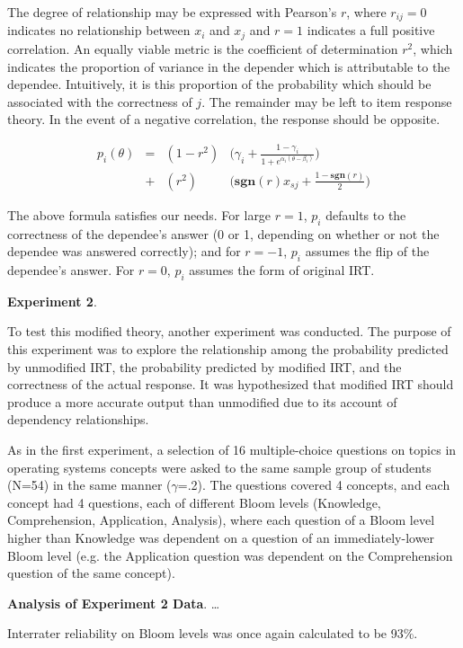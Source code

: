 \documentclass[a4paper,twocolumn]{article}
\begin{document}
The degree of relationship may be expressed with Pearson's $r$, where
$r_{ij}=0$ indicates no relationship between $x_i$ and $x_j$ and $r=1$
indicates a full positive correlation.  An equally viable metric is the
coefficient of determination $r^2$, which indicates the proportion of variance
in the depender which is attributable to the dependee.  Intuitively, it is
this proportion of the probability which should be associated with the
correctness of $j$.  The remainder may be left to item response theory.
In the event of a negative correlation, the response should be opposite.


\begin{align*}
  p_i(\theta) &=& (1-r^2) & \Big(\gamma_i + \frac{1-\gamma_i}{1+e^{\alpha_i(\theta-\beta_i)}}\Big) \\
              &+& (r^2)   & \Big(\mathbf{sgn}(r)x_{sj}+\frac{1-\mathbf{sgn}(r)}{2}\Big)
\end{align*}

The above formula satisfies our needs.  For large $r=1$, $p_i$ defaults to the
correctness of the dependee's answer (0 or 1, depending on whether or not the
dependee was answered correctly);  and for $r=-1$, $p_i$ assumes the flip of
the dependee's answer.  For $r=0$, $p_i$ assumes the form of original IRT.  


\textbf{Experiment 2}. 

To test this modified theory, another experiment was conducted.  The purpose of
this experiment was to explore the relationship among the probability predicted
by unmodified IRT, the probability predicted by modified IRT, and the
correctness of the actual response.  It was hypothesized that modified IRT
should produce a more accurate output than unmodified due to its account of
dependency relationships.

As in the first experiment, a selection of 16 multiple-choice questions on
topics in operating systems concepts were asked to the same sample group of
students (N=54) in the same manner ($\gamma$=.2).  The questions covered 4
concepts, and each concept had 4 questions, each of different Bloom levels
(Knowledge, Comprehension, Application, Analysis), where each question of a
Bloom level higher than Knowledge was dependent on a question of an
immediately-lower Bloom level (e.g. the Application question was dependent on
the Comprehension question of the same concept).


\textbf{Analysis of Experiment 2 Data}. \ldots

Interrater reliability on Bloom levels was once again calculated to be 93\%. 
\end{document}
